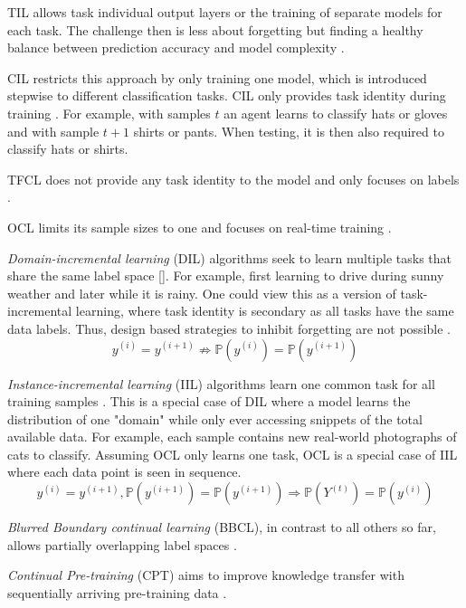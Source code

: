 TIL allows task individual output layers or the training of separate models for each task. The challenge then is less about forgetting but finding a healthy balance between prediction accuracy and model complexity \cite{vandeVen2022}.

CIL restricts this approach by only training one model, which is introduced stepwise to different classification tasks. CIL only provides task identity during training \cite{vandeVen2022}. For example, with samples $t$ an agent learns to classify hats or gloves and with sample $t+1$ shirts or pants. When testing, it is then also required to classify hats or shirts.

TFCL does not provide any task identity to the model and only focuses on labels \cite{aljundi2019tfcl}.

OCL limits its sample sizes to one and focuses on real-time training \cite{bidaki2025, LW}.

\textit{Domain-incremental learning} (DIL) algorithms seek to learn multiple tasks that share the same label space []. For example, first learning to drive during sunny weather and later while it is rainy. One could view this as a version of task-incremental learning, where task identity is secondary as all tasks have the same data labels. Thus, design based strategies to inhibit forgetting are not possible \cite{vandeVen2022}.
\begin{equation}
	y^{(i)}=y^{(i+1)} \nRightarrow \mathbb{P}(y^{(i)}) = \mathbb{P}(y^{(i+1)})
\end{equation}

\textit{Instance-incremental learning} (IIL) algorithms learn one common task for all training samples \cite{bidaki2025, LW}.
This is a special case of DIL where a model learns the distribution of one "domain" while only ever accessing snippets of the total available data. For example, each sample contains new real-world photographs of cats to classify. Assuming OCL only learns one task, OCL is a special case of IIL where each data point is seen in sequence.
\begin{equation}
	y^{(i)}=y^{(i+1)}, \mathbb{P}(y^{(i+1)}) = \mathbb{P}(y^{(i+1)}) \Rightarrow \mathbb{P}(Y^{(t)})=\mathbb{P}(y^{(i)})
\end{equation}

\textit{Blurred Boundary continual learning} (BBCL), in contrast to all others so far, allows partially overlapping label spaces \cite{bidaki2025,LW}.

\textit{Continual Pre-training} (CPT) aims to improve knowledge transfer with sequentially arriving pre-training data \cite{bidaki2025, LW}.

